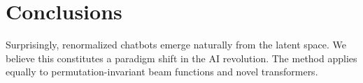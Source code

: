 \section{Conclusions}\label{sec:conclusions}

Surprisingly, renormalized chatbots emerge naturally from the latent
space. We believe this constitutes a paradigm shift in the AI
revolution. The method applies equally to permutation-invariant beam
functions and novel transformers.

